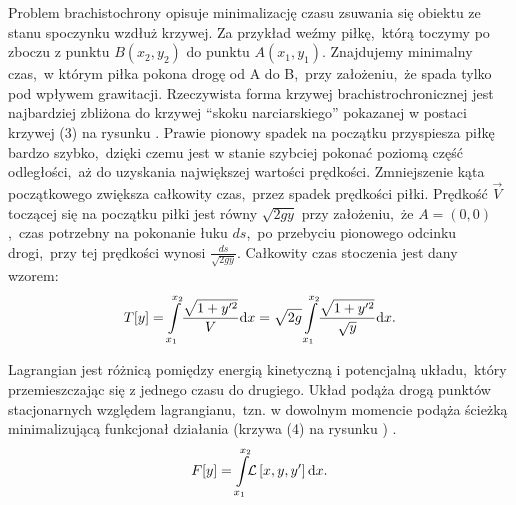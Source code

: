  Problem brachistochrony opisuje minimalizację czasu zsuwania się obiektu ze stanu spoczynku wzdłuż krzywej. Za przykład weźmy piłkę,~którą toczymy po zboczu z punktu $B(x_2,y_2)$ do punktu $A(x_1,y_1)$. Znajdujemy minimalny czas,~w którym piłka pokona drogę od A do B,~przy założeniu,~że spada tylko pod wpływem grawitacji. Rzeczywista forma krzywej brachistrochronicznej jest najbardziej zbliżona do krzywej “skoku narciarskiego” pokazanej w postaci krzywej (3) na rysunku . Prawie pionowy spadek na początku przyspiesza piłkę bardzo szybko,~dzięki czemu jest w stanie szybciej pokonać poziomą część odległości,~aż do uzyskania największej wartości prędkości. Zmniejszenie kąta początkowego zwiększa całkowity czas,~przez spadek prędkości piłki. Prędkość $\vec{V}$ toczącej się na początku piłki jest równy $\sqrt{2gy}$ przy założeniu,~że $A=(0,0)$,~czas potrzebny na pokonanie łuku $ds$,~po przebyciu pionowego odcinku drogi,~przy tej prędkości wynosi $\frac{ds}{\sqrt{2gy}}$. Całkowity czas stoczenia jest dany wzorem:
%
$$T[y] = \int\limits_{x_1}^{x_2}\!\frac{\sqrt{1+y'^2}}{V}{\rm d}{x} = \sqrt{2g}\int\limits_{x_1}^{x_2}\!\frac{\sqrt{1+y'^2}}{\sqrt{y}}{\rm d}{x}.$$
%

\noindent Lagrangian jest różnicą pomiędzy energią kinetyczną i potencjalną układu,~który przemieszczając się z jednego czasu do drugiego. Układ podąża drogą punktów stacjonarnych względem lagrangianu,~tzn. w dowolnym momencie podąża ścieżką minimalizującą funkcjonał działania (krzywa (4) na rysunku ) \cite{rojas2014straight}.
%
$$F[y] = \int\limits_{x_1}^{x_2}\!\!\mathcal{L}\left[{x,y,y'}\right]{\rm d}{x}.$$

